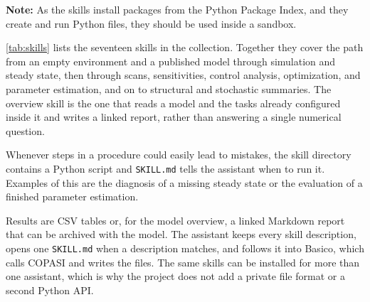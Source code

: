 \documentclass[10pt,a4paper,onecolumn]{article}
\begin{document}
  \textbf{Note:} As the skills install packages from the Python Package
  Index, and they create and run Python files, they should be used inside
  a sandbox.

  \autoref{tab:skills} lists the seventeen skills in the collection.
  Together they cover the path from an empty environment and a published
  model through simulation and steady state, then through scans,
  sensitivities, control analysis, optimization, and parameter estimation,
  and on to structural and stochastic summaries. The overview skill is the
  one that reads a model and the tasks already configured inside it and
  writes a linked report, rather than answering a single numerical
  question.

  Whenever steps in a procedure could easily lead to mistakes, the skill
  directory contains a Python script and \texttt{SKILL.md} tells the
  assistant when to run it. Examples of this are the diagnosis of a
  missing steady state or the evaluation of a finished parameter
  estimation.

  Results are CSV tables or, for the model overview, a linked Markdown
  report that can be archived with the model. The assistant keeps every
  skill description, opens one \texttt{SKILL.md} when a description
  matches, and follows it into Basico, which calls COPASI and writes the
  files. The same skills can be installed for more than one assistant,
  which is why the project does not add a private file format or a second
  Python API.
\end{document}
